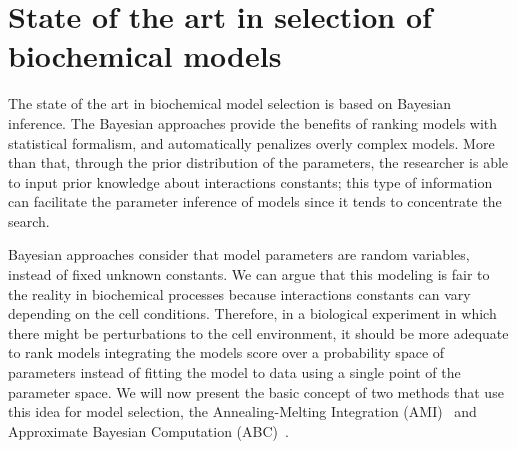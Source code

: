 \section{State of the art in selection of biochemical models}
The state of the art in biochemical model selection is based on Bayesian
inference. The Bayesian approaches provide the benefits of ranking 
models with statistical formalism, and automatically penalizes overly 
complex models. More than that, through the prior distribution of the
parameters, the researcher is able to input prior knowledge about 
interactions constants; this type of information can facilitate the 
parameter inference of models since it tends to concentrate the search.

Bayesian approaches consider that model parameters are random variables, 
instead of fixed unknown constants. We can argue that this modeling is 
fair to the reality in biochemical processes because interactions 
constants can vary depending on the cell conditions. Therefore, in a 
biological experiment in which there might be perturbations to the cell 
environment, it should be more adequate to rank models integrating the 
models score over a probability space of parameters instead of fitting 
the model to data using a single point of the parameter space. We will 
now present the basic concept of two methods that use this idea for 
model selection, the Annealing-Melting Integration 
(AMI)~\cite{Vyshemirsky2007} and Approximate Bayesian Computation 
(ABC)~\cite{Toni2009}.

